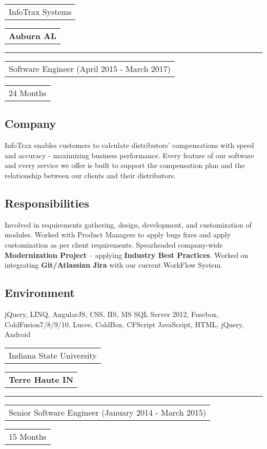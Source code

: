 \documentclass[letterpaper,11pt]{article}
\begin{document}
    \vspace{1.27cm}
    \noindent
    \begin{tabular}[t]{@{}l}
    \Large{InfoTrax Systems}
    \end{tabular}
    \hfill
    \begin{tabular}[t]{l@{}}
    \textbf{Auburn AL}
    \end{tabular}
    \noindent\rule{\textwidth}{0.5pt}
    \begin{tabular}[t]{@{}l}
    Software Engineer (April 2015 - March 2017)
    \end{tabular}
    \hfill
    \begin{tabular}[t]{l@{}}
    24 Months
    \end{tabular}

    \subsection{Company}
    InfoTrax enables customers to calculate distributors’ compensations with speed and accuracy - maximizing business performance. Every feature of our software and every service we offer is built to support the compensation plan and the relationship between our clients and their distributors.

    \subsection{Responsibilities}
    Involved in requirements gathering, design, development, and customization of modules. Worked with Product Managers to apply bugs fixes and apply customization as per client requirements. Spearheaded company-wide \textbf{Modernization Project} – applying \textbf{Industry Best Practices}. Worked on integrating \textbf{Git/Atlassian Jira} with our current WorkFlow System.

    \subsection{Environment}
    jQuery, LINQ, AngularJS, CSS, IIS, MS SQL Server 2012, Fusebox, ColdFusion7/8/9/10, Lucee, ColdBox, CFScript JavaScript, HTML, jQuery, Android


    \vspace{1.27cm}
    \noindent
    \begin{tabular}[t]{@{}l}
    \Large{Indiana State University}
    \end{tabular}
    \hfill
    \begin{tabular}[t]{l@{}}
    \textbf{Terre Haute IN}
    \end{tabular}
    \noindent\rule{\textwidth}{0.5pt}
    \begin{tabular}[t]{@{}l}
    Senior Software Engineer (January 2014 - March 2015)
    \end{tabular}
    \hfill
    \begin{tabular}[t]{l@{}}
    15 Months
    \end{tabular}
\end{document}
